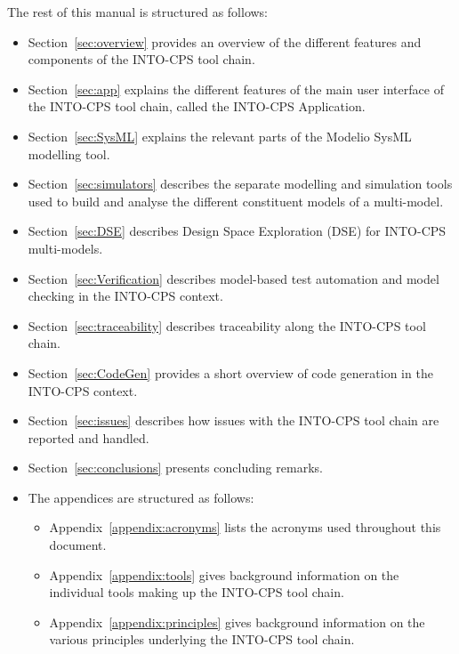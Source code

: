 The rest of this manual is structured as follows:
%
%
%
\begin{itemize}
%
\item  Section~\ref{sec:overview} provides an overview of the different features and components of the INTO-CPS tool chain.
%
\item  Section~\ref{sec:app} explains the different features of the main user interface of the INTO-CPS tool chain, called the INTO-CPS Application.
%
\item  Section~\ref{sec:SysML} explains the relevant parts of the Modelio SysML modelling tool.
%
\item  Section~\ref{sec:simulators} describes the separate modelling and simulation tools used to build and analyse the different constituent models of a multi-model.
%
\item  Section~\ref{sec:DSE} describes Design Space Exploration (DSE) for INTO-CPS multi-models.
%
\item  Section~\ref{sec:Verification} describes model-based test automation and model checking in the INTO-CPS context.
%
\item  Section~\ref{sec:traceability} describes traceability along the INTO-CPS tool chain.
%
\item  Section~\ref{sec:CodeGen} provides a short overview of code generation in the INTO-CPS context.
%
\item  Section~\ref{sec:issues} describes how issues with the INTO-CPS tool chain are reported and handled.
%
\item  Section~\ref{sec:conclusions} presents concluding remarks.
%
\item  The appendices are structured as follows:
%
\begin{itemize}
%
\item  Appendix~\ref{appendix:acronyms} lists the acronyms used throughout this document.
%
\item  Appendix~\ref{appendix:tools} gives background information on the individual tools making up the INTO-CPS tool chain.
%
\item  Appendix~\ref{appendix:principles} gives background information on the various principles underlying the INTO-CPS tool chain.
%
%
\end{itemize}
%
\end{itemize}
